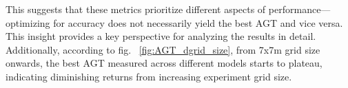 \documentclass[runningheads]{llncs}
\begin{document}


This suggests that these metrics prioritize different aspects of performance—optimizing for accuracy does not necessarily yield the best AGT and vice versa. This insight provides a key perspective for analyzing the results in detail. Additionally, according to fig. ~\ref{fig:AGT_dgrid_size}, from 7x7m grid size onwards, the best AGT measured across different models starts to plateau, indicating diminishing returns from increasing experiment grid size.

\end{document}
